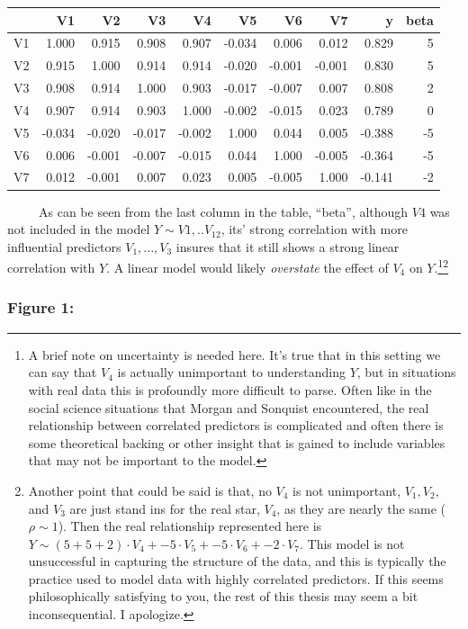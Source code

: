 \documentclass[12pt,twoside]{reedthesis}
\begin{document}
  \begin{longtable}[]{@{}lrrrrrrrrr@{}}
  \toprule
  & V1 & V2 & V3 & V4 & V5 & V6 & V7 & y & beta\tabularnewline
  \midrule
  \endhead
  V1 & 1.000 & 0.915 & 0.908 & 0.907 & -0.034 & 0.006 & 0.012 & 0.829 &
  5\tabularnewline
  V2 & 0.915 & 1.000 & 0.914 & 0.914 & -0.020 & -0.001 & -0.001 & 0.830 &
  5\tabularnewline
  V3 & 0.908 & 0.914 & 1.000 & 0.903 & -0.017 & -0.007 & 0.007 & 0.808 &
  2\tabularnewline
  V4 & 0.907 & 0.914 & 0.903 & 1.000 & -0.002 & -0.015 & 0.023 & 0.789 &
  0\tabularnewline
  V5 & -0.034 & -0.020 & -0.017 & -0.002 & 1.000 & 0.044 & 0.005 & -0.388
  & -5\tabularnewline
  V6 & 0.006 & -0.001 & -0.007 & -0.015 & 0.044 & 1.000 & -0.005 & -0.364
  & -5\tabularnewline
  V7 & 0.012 & -0.001 & 0.007 & 0.023 & 0.005 & -0.005 & 1.000 & -0.141 &
  -2\tabularnewline
  \bottomrule
  \end{longtable}
  
  ~~~~~As can be seen from the last column in the table, ``beta'',
  although \(V4\) was not included in the model \(Y \sim V1,..V_{12}\),
  its' strong correlation with more influential predictors \(V_1,...,V_3\)
  insures that it still shows a strong linear correlation with \(Y\). A
  linear model would likely \emph{overstate} the effect of \(V_4\) on
  \(Y\).\footnote{A brief note on uncertainty is needed here. It's true
    that in this setting we can say that \(V_4\) is actually unimportant
    to understanding \(Y\), but in situations with real data this is
    profoundly more difficult to parse. Often like in the social science
    situations that Morgan and Sonquist encountered, the real relationship
    between correlated predictors is complicated and often there is some
    theoretical backing or other insight that is gained to include
    variables that may not be important to the model.}\footnote{Another
    point that could be said is that, no \(V_4\) is not unimportant,
    \(V_1, V_2,\) and \(V_3\) are just stand ins for the real star,
    \(V_4\), as they are nearly the same (\(\rho \sim 1\)). Then the real
    relationship represented here is
    \(Y \sim (5 + 5 + 2) \cdot V_4 + -5 \cdot V_5 + -5 \cdot V_6 + -2 \cdot V_7\).
    This model is not unsuccessful in capturing the structure of the data,
    and this is typically the practice used to model data with highly
    correlated predictors. If this seems philosophically satisfying to
    you, the rest of this thesis may seem a bit inconsequential. I
    apologize.}
  
  \subsubsection{Figure 1:}\label{figure-1}
  
\end{document}
